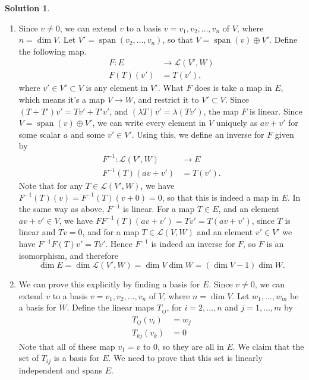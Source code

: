 \documentclass[12pt]{article}
\theoremstyle{definition}
\theoremstyle{definition}
\newtheorem*{soln}{Solution}
\newcommand{\Span}{\operatorname{span}}
\begin{document}
\begin{soln}
\begin{enumerate}[label=\arabic*.]
\begin{enumerate}[label=\textbf{Method \arabic*.}]
\item Since $v\neq 0$, we can extend $v$ to a basis $v=v_1,v_2,\dots,v_n$ of $V$, where $n=\dim V$. Let $V'=\Span(v_2,\dots,v_n)$, so that $V=\Span(v)\oplus V'$. Define the following map.
\begin{align*}
F:E &\to \mathcal{L}(V',W)\\
F(T)(v') &= T(v'),
\end{align*}
where $v'\in V'\subset V$ is any element in $V'$. What $F$ does is take a map in $E$, which means it's a map $V\to W$, and restrict it to $V'\subset V$. Since $(T+T')v'=Tv'+T'v'$, and $(\lambda T)v'=\lambda (Tv')$, the map $F$ is linear. Since $V=\Span(v)\oplus V'$, we can write every element in $V$ uniquely as $av+v'$ for some scalar $a$ and some $v'\in V'$. Using this, we define an inverse for $F$ given by 
\begin{align*}
F^{-1}:\mathcal{L}(V',W) &\to E\\
F^{-1}(T)(av+v') &= T(v').
\end{align*}
Note that for any $T\in\mathcal{L}(V',W)$, we have $F^{-1}(T)(v)=F^{-1}(T)(v+0)=0$, so that this is indeed a map in $E$. In the same way as above, $F^{-1}$ is linear. For a map $T\in E$, and an element $av+v'\in V$, we have $FF^{-1}(T)(av+v')=Tv'=T(av+v')$, since $T$ is linear and $Tv=0$, and for a map $T\in \mathcal{L}(V,W)$ and an element $v'\in V'$ we have $F^{-1}F(T)v'=Tv'$. Hence $F^{-1}$ is indeed an inverse for $F$, so $F$ is an isomorphism, and therefore
\[\dim E=\dim\mathcal{L}(V',W)=\dim V\dim W=(\dim V-1)\dim W.\]

\item We can prove this explicitly by finding a basis for $E$. Since $v\neq 0$, we can extend $v$ to a basis $v=v_1,v_2,\dots,v_n$ of $V$, where $n=\dim V$. Let $w_1,\dots,w_m$ be a basis for $W$. Define the linear maps $T_{ij}$, for $i=2,\dots,n$ and $j=1,\dots,m$ by
\begin{align*}
T_{ij}(v_i) &= w_j \\
T_{kj}(v_k) &= 0 \tag{for $k\neq i$.}
\end{align*}
Note that all of these map $v_1=v$ to $0$, so they are all in $E$. We claim that the set of $T_{ij}$ is a basis for $E$. We need to prove that this set is linearly independent and spans $E$.


\end{enumerate}
\end{enumerate}
\end{soln}
\end{document}
